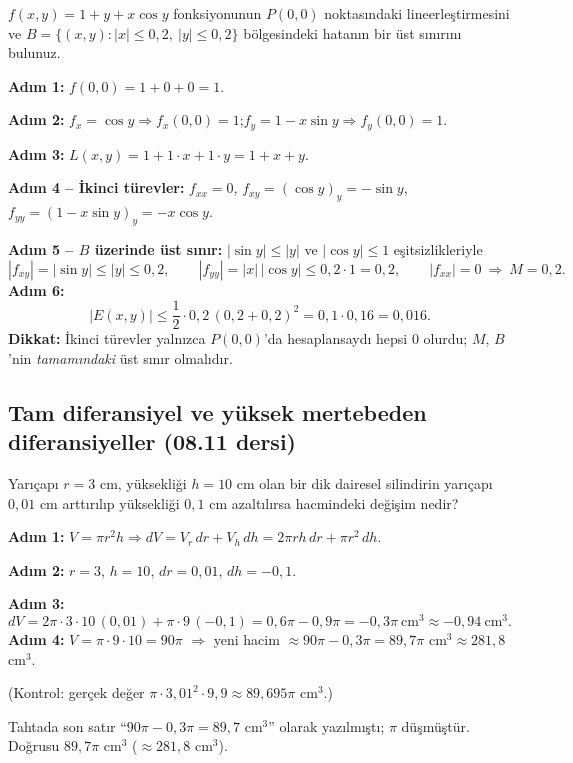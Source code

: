 \begin{soru}
$f(x,y)=1+y+x\cos y$ fonksiyonunun $P(0,0)$ noktasındaki lineerleştirmesini ve
$B=\{(x,y):|x|\le0{,}2,\ |y|\le0{,}2\}$ bölgesindeki hatanın bir üst sınırını bulunuz.
\end{soru}
\begin{cevap}
\textbf{Adım 1:} $f(0,0)=1+0+0=1$.

\textbf{Adım 2:} $f_x=\cos y\Rightarrow f_x(0,0)=1$;\quad $f_y=1-x\sin y\Rightarrow f_y(0,0)=1$.

\textbf{Adım 3:} $L(x,y)=1+1\cdot x+1\cdot y=1+x+y$.

\textbf{Adım 4 -- İkinci türevler:} $f_{xx}=0$, $f_{xy}=(\cos y)_y=-\sin y$, $f_{yy}=(1-x\sin y)_y=-x\cos y$.

\textbf{Adım 5 -- $B$ üzerinde üst sınır:} $|\sin y|\le|y|$ ve $|\cos y|\le1$ eşitsizlikleriyle
\[
|f_{xy}|=|\sin y|\le|y|\le0{,}2,\qquad |f_{yy}|=|x|\,|\cos y|\le0{,}2\cdot1=0{,}2,\qquad |f_{xx}|=0
\ \Rightarrow\ M=0{,}2 .
\]
\textbf{Adım 6:}
\[ |E(x,y)|\le\frac12\cdot0{,}2\,(0{,}2+0{,}2)^2=0{,}1\cdot0{,}16=0{,}016 . \]
\textbf{Dikkat:} İkinci türevler yalnızca $P(0,0)$'da hesaplansaydı hepsi $0$ olurdu; $M$, $B$'nin \emph{tamamındaki}
üst sınır olmalıdır.
\end{cevap}

\subsection{Tam diferansiyel ve yüksek mertebeden diferansiyeller (08.11 dersi)}

\begin{soru}
Yarıçapı $r=3$ cm, yüksekliği $h=10$ cm olan bir dik dairesel silindirin yarıçapı $0{,}01$ cm arttırılıp yüksekliği
$0{,}1$ cm azaltılırsa hacmindeki değişim nedir?
\end{soru}
\begin{cevap}
\textbf{Adım 1:} $V=\pi r^2h\Rightarrow dV=V_r\,dr+V_h\,dh=2\pi rh\,dr+\pi r^2\,dh$.

\textbf{Adım 2:} $r=3$, $h=10$, $dr=0{,}01$, $dh=-0{,}1$.

\textbf{Adım 3:}
\[
dV=2\pi\cdot3\cdot10\,(0{,}01)+\pi\cdot9\,(-0{,}1)=0{,}6\pi-0{,}9\pi=-0{,}3\pi\ \text{cm}^3\approx-0{,}94\ \text{cm}^3 .
\]
\textbf{Adım 4:} $V=\pi\cdot9\cdot10=90\pi$ $\Rightarrow$ yeni hacim $\approx90\pi-0{,}3\pi=89{,}7\pi$ cm$^3\approx281{,}8$ cm$^3$.

(Kontrol: gerçek değer $\pi\cdot3{,}01^2\cdot9{,}9\approx89{,}695\pi$ cm$^3$.)
\end{cevap}
\begin{dikkat}
Tahtada son satır ``$90\pi-0{,}3\pi=89{,}7$ cm$^3$'' olarak yazılmıştı; $\pi$ düşmüştür. Doğrusu $89{,}7\pi$ cm$^3$
($\approx281{,}8$ cm$^3$).
\end{dikkat}


